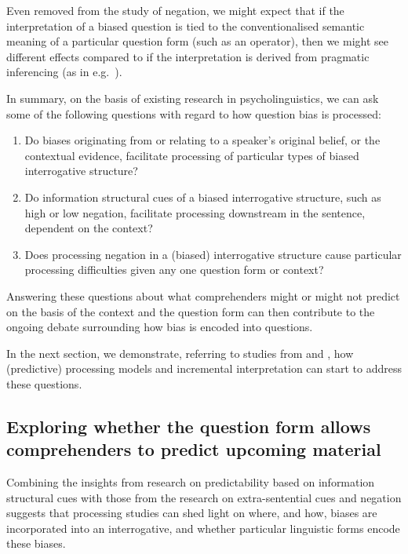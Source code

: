 \documentclass[output=paper,colorlinks,citecolor=brown]{langscibook}
\begin{document}
Even removed from the study of negation, we might expect that if the interpretation of a biased question is tied to the conventionalised semantic meaning of a particular question form (such as an operator), then we might see different effects compared to if the interpretation is derived from pragmatic inferencing (as in e.g.\ \citealt{van_rooij_polar_2003}). 

In summary, on the basis of existing research in psycholinguistics, we can ask some of the following questions with regard to how question bias is processed:

\begin{enumerate}
    \item Do biases originating from or relating to a speaker's original belief, or the contextual evidence, facilitate processing of particular types of biased interrogative structure?
    \item Do information structural cues of a biased interrogative structure, such as high or low negation, facilitate processing downstream in the sentence, dependent on the context?
    \item Does processing negation in a (biased) interrogative structure cause particular processing difficulties given any one question form or context?
\end{enumerate}

Answering these questions about what comprehenders might or might not predict on the basis of the context and the question form can then contribute to the ongoing debate surrounding how bias is encoded into questions.

In the next section, we demonstrate, referring to studies from \citet{tian_representing_2021} and \citet{macuch_processing_inprep}, how (predictive) processing models and incremental interpretation can start to address these questions. 

\subsection{Exploring whether the question form allows comprehenders to predict upcoming material}\label{sec4}

Combining the insights from research on predictability based on information structural cues with those from the research on extra-sentential cues and negation suggests that processing studies can shed light on where, and how, biases are incorporated into an interrogative, and whether particular linguistic forms encode these biases.
\end{document}
